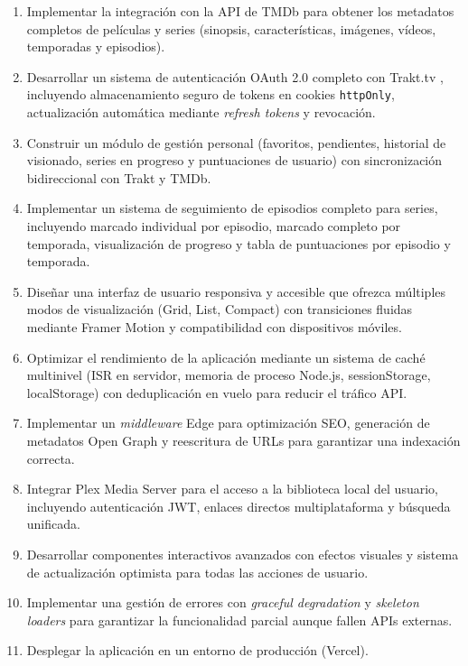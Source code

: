 \begin{enumerate}
\item Implementar la integración con la API de TMDb \parencite{TMDb:2024} para obtener los metadatos completos de películas y series (sinopsis, características, imágenes, vídeos, temporadas y episodios).
\item Desarrollar un sistema de autenticación OAuth 2.0 \parencite{OWASP:2021,NextJS:2024} completo con Trakt.tv \parencite{Trakt:2024}, incluyendo almacenamiento seguro de tokens en cookies \texttt{httpOnly}, actualización automática mediante \textit{refresh tokens} y revocación.
\item Construir un módulo de gestión personal (favoritos, pendientes, historial de visionado, series en progreso y puntuaciones de usuario) con sincronización bidireccional con Trakt y TMDb.
\item Implementar un sistema de seguimiento de episodios completo para series, incluyendo marcado individual por episodio, marcado completo por temporada, visualización de progreso y tabla de puntuaciones por episodio y temporada.
\item Diseñar una interfaz de usuario responsiva y accesible \parencite{W3C:2023} que ofrezca múltiples modos de visualización (Grid, List, Compact) con transiciones fluidas mediante Framer Motion \parencite{Framer:2024} y compatibilidad con dispositivos móviles.
\item Optimizar el rendimiento de la aplicación mediante un sistema de caché multinivel (ISR en servidor, memoria de proceso Node.js, sessionStorage, localStorage) con deduplicación en vuelo para reducir el tráfico API.
\item Implementar un \textit{middleware} Edge para optimización SEO, generación de metadatos Open Graph y reescritura de URLs para garantizar una indexación correcta.
\item Integrar Plex Media Server \parencite{Plex:2024} para el acceso a la biblioteca local del usuario, incluyendo autenticación JWT, enlaces directos multiplataforma y búsqueda unificada.
\item Desarrollar componentes interactivos avanzados con efectos visuales y sistema de actualización optimista para todas las acciones de usuario.
\item Implementar una gestión de errores con \textit{graceful degradation} y \textit{skeleton loaders} para garantizar la funcionalidad parcial aunque fallen APIs externas.
\item Desplegar la aplicación en un entorno de producción (Vercel).
\end{enumerate}

